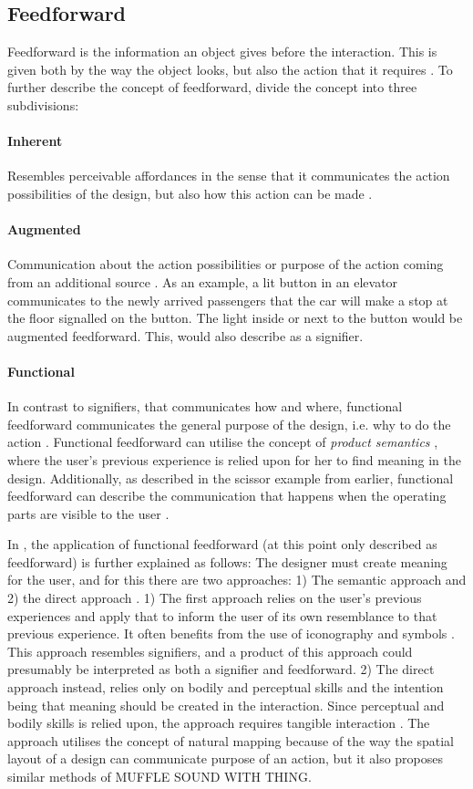 \subsection{Feedforward} Feedforward is the information an object gives before the interaction. This is given both by the way the object looks, but also the action that it requires \cite{frogger}. To further describe the concept of feedforward,  divide the concept into three subdivisions:
\paragraph{Inherent} Resembles perceivable affordances \cite{norman} in the sense that it communicates the action possibilities of the design, but also how this action can be made \cite{frogger}.
\paragraph{Augmented} Communication about the action possibilities or purpose of the action coming from an additional source \cite{frogger}. As an example, a lit button in an elevator communicates to the newly arrived passengers that the car will make a stop at the floor signalled on the button. The light inside or next to the button would be augmented feedforward. This,  would also describe as a signifier.
\paragraph{Functional} In contrast to signifiers, that communicates how and where, functional feedforward communicates the general purpose of the design, i.e. why to do the action \cite{frogger}. Functional feedforward can utilise the concept of \textit{product semantics} \cite{semantics}, where the user's previous experience is relied upon for her to find meaning in the design. Additionally, as described in the scissor example from earlier, functional feedforward can describe the communication that happens when the operating parts are visible to the user \cite{frogger}.

In , the application of functional feedforward (at this point only described as feedforward) is further explained as follows: The designer must create meaning for the user, and for this there are two approaches: 1) The semantic approach and 2) the direct approach \cite{howdonald}. 1) The first approach relies on the user's previous experiences and apply that to inform the user of its own resemblance to that previous experience. It often benefits from the use of iconography and symbols \cite{howdonald}. This approach resembles signifiers, and a product of this approach could presumably be interpreted as both a signifier and feedforward. 2) The direct approach instead, relies only on bodily and perceptual skills and the intention being that meaning should be created in the interaction. Since perceptual and bodily skills is relied upon, the approach requires tangible interaction \cite{howdonald}. The approach utilises the concept of natural mapping because of the way the spatial layout of a design can communicate purpose of an action, but it also proposes similar methods of MUFFLE SOUND WITH THING.

